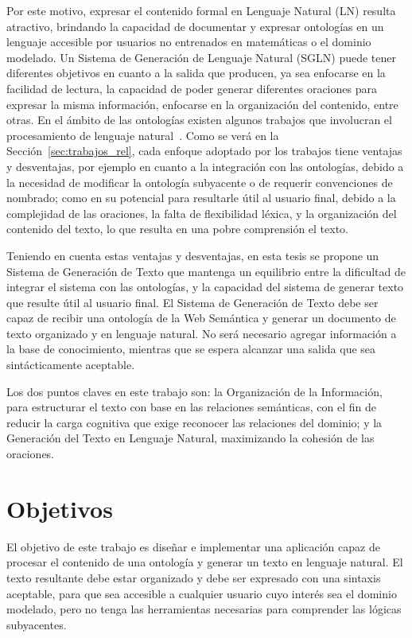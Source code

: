 \documentclass[11pt,a4paper,spanish]{book}
\begin{document}
Por este motivo, expresar el contenido formal en Lenguaje Natural (LN) resulta atractivo, brindando la capacidad de documentar y expresar ontologías en un lenguaje accesible por usuarios no entrenados en matemáticas o el dominio modelado. Un Sistema de Generación de Lenguaje Natural (SGLN) puede tener diferentes objetivos en cuanto a la salida que producen, ya sea enfocarse en la facilidad de lectura, la capacidad de poder generar diferentes oraciones para expresar la misma información,  enfocarse en la organización del contenido, entre otras. En el ámbito de las ontologías existen algunos trabajos que involucran el procesamiento de lenguaje natural~\cite{moreno2018ontologia}\cite{perez2002explotacion}\cite{vallez2009web}. Como se verá en la Sección~\ref{sec:trabajos_rel}, cada enfoque adoptado por los trabajos tiene ventajas y desventajas, por ejemplo en cuanto a la integración con las ontologías, debido a la necesidad de modificar la ontología subyacente o de requerir convenciones de nombrado; como en su potencial para resultarle útil al usuario final, debido a la complejidad de las oraciones, la falta de flexibilidad léxica, y la organización del contenido del texto, lo que resulta en una pobre comprensión el texto.  

Teniendo en cuenta estas ventajas y desventajas, en esta tesis se propone un Sistema de Generación de Texto que mantenga un equilibrio entre la dificultad de integrar el sistema con las ontologías, y la capacidad del sistema de generar texto que resulte útil al usuario final. El Sistema de Generación de Texto debe   ser capaz de recibir una ontología de la Web Semántica y generar un documento de texto organizado y en lenguaje natural. No será necesario agregar información a la base de conocimiento, mientras que se espera alcanzar una salida que sea sintácticamente aceptable.

Los dos puntos claves en este trabajo son: la Organización de la Información, para estructurar el texto con base en las relaciones semánticas, con el fin de reducir la carga cognitiva que exige reconocer las relaciones del dominio; y la Generación del Texto en Lenguaje Natural, maximizando la cohesión de las oraciones.

\section{Objetivos}\label{Intro:objetivo}
El objetivo de este trabajo es diseñar e implementar una aplicación capaz de procesar el contenido de una ontología y generar un texto en lenguaje natural. El texto resultante debe estar organizado y debe ser expresado con una sintaxis aceptable, para que sea accesible a cualquier usuario cuyo interés sea el dominio modelado, pero no tenga las herramientas necesarias para comprender las lógicas subyacentes.
\end{document}
